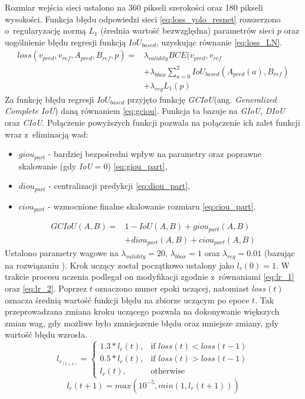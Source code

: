 Rozmiar wejścia sieci ustalono na 360 pikseli szerokości oraz 180 pikseli wysokości.
Funkcja błędu odpowiedzi sieci \eqref{eq:loss_yolo_resnet} rozszerzono o~regularyzację normą $L_1$ (średnia wartość bezwzględna) parametrów sieci $p$ oraz uogólnienie błędu regresji funkcją $IoU_{based}$, uzyskując równanie \eqref{eq:loss_LN}.
\begin{equation}
\begin{aligned}
loss(v_{pred},v_{ref},A_{pred}, B_{ref}, p) 
=& \lambda_{validity} BCE(v_{pred}, v_{ref} \\
&+ \lambda_{bbox} \sum_{a = 0}^{2} IoU_{based}(A_{pred}(a), B_{ref}) \\
&+ \lambda_{reg} L_1(p)
\end{aligned}
\label{eq:loss_LN}
\end{equation}
Za funkcję błędu regresji $IoU_{based}$ przyjęto funkcję \emph{GCIoU}(ang. \emph{Generalized Complete IoU}) daną równaniem \eqref{eq:gciou}. 
Funkcja ta bazuje na \emph{GIoU}\cite{giou}, \emph{DIoU}\cite{dciou} oraz \emph{CIoU}\cite{dciou}. 
Połączenie powyższych funkcji pozwala na połączenie ich zalet funkcji wraz z~eliminacją wad: 
\begin{itemize}
    \item $giou_{part}$ - bardziej bezpośredni wpływ na parametry oraz poprawne skalowanie (gdy \emph{IoU}$ = 0$) \eqref{eq:giou_part},
    \item $diou_{part}$ - centralizacji predykcji \eqref{eq:diou_part},
    \item $ciou_{part}$ - wzmocnione finalne skalowanie rozmiaru \eqref{eq:ciou_part}. 
\end{itemize}
\begin{equation}
\begin{aligned}
GCIoU(A,B) =& 1 - IoU(A,B) + giou_{part}(A,B)\\ 
&+ diou_{part}(A,B) + ciou_{part}(A,B)
\end{aligned}
\label{eq:gciou}
\end{equation}
Ustalono parametry wagowe na $\lambda_{validity} = 20$, $\lambda_{bbox} = 1$ oraz $\lambda_{reg} = 0.01$ (bazując na rozwiązaniu \cite{ultra_net}).
Krok uczący został początkowo ustalony jako $l_r(0)=1$. 
W trakcie procesu uczenia podlegał on modyfikacji zgodnie z~równaniami \eqref{eq:lr_1} oraz \eqref{eq:lr_2}.
Poprzez $t$ oznaczono numer epoki uczącej, natomiast $loss(t)$ oznacza średnią wartość funkcji błędu na zbiorze uczącym po epoce $t$.
Tak przeprowadzana zmiana kroku uczącego pozwala na dokonywanie większych zmian wag, gdy możliwe było zmniejszenie błędu oraz mniejsze zmiany, gdy wartość błędu wzrosła.
\begin{equation}
l_r_(t+1) = 
\begin{cases}
    1.3*l_r(t), &\text{if } loss(t) < loss(t-1) \\
    0.5*l_r(t), &\text{if } loss(t) > loss(t-1) \\
    l_r(t), &\text{otherwise}
\end{cases}
\label{eq:lr_1}
\end{equation}
\begin{equation}
l_r(t+1) = max(10^{-5}, min(1, l_r(t+1)))
\label{eq:lr_2}
\end{equation}


